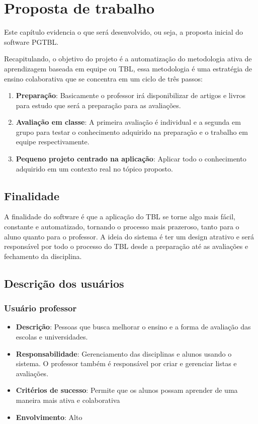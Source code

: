\chapter{Proposta de trabalho}

Este capítulo evidencia o que será desenvolvido, ou seja, a proposta inicial do software PGTBL.

Recapitulando, o objetivo do projeto é a automatização do metodologia ativa de aprendizagem baseada em equipe ou TBL, essa metodologia é uma estratégia de ensino colaborativa que se concentra em um ciclo de três passos:

\begin{enumerate}
  \item \textbf{Preparação}: Basicamente o professor irá disponibilizar de artigos e livros para estudo que será a preparação para as avaliações.
  \item \textbf{Avaliação em classe}: A primeira avaliação é individual e a segunda em grupo para testar o conhecimento adquirido na preparação e o trabalho em equipe respectivamente.
  \item \textbf{Pequeno projeto centrado na aplicação}: Aplicar todo o conhecimento adquirido em um contexto real no tópico proposto.
\end{enumerate}

\section{Finalidade}

A finalidade do software é que a aplicação do TBL se torne algo mais fácil, constante e automatizado, tornando o processo mais prazeroso, tanto para o aluno quanto para o professor. A ideia do sistema é ter um design atrativo e será responsável por todo o processo do TBL desde a preparação até as avaliações e fechamento da disciplina.

\section{Descrição dos usuários}

\subsection{Usuário professor}

\begin{itemize}
  \item \textbf{Descrição}: Pessoas que busca melhorar o ensino e a forma de avaliação das escolas e universidades.
  \item \textbf{Responsabilidade}: Gerenciamento das disciplinas e alunos usando o sistema. O professor também é responsável por criar e gerenciar listas e avaliações.
  \item \textbf{Critérios de sucesso}: Permite que os alunos possam aprender de uma maneira mais ativa e colaborativa
  \item \textbf{Envolvimento}: Alto
\end{itemize}

